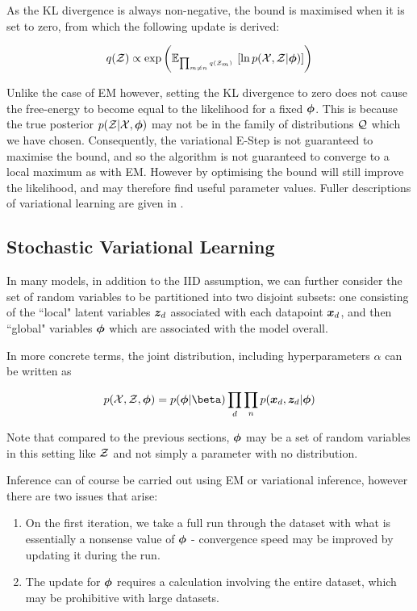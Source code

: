 As the KL divergence is always non-negative, the bound is maximised when it is set to zero, from which the following update is derived: 

\begin{align*}
q({ \mathcal{Z} }) \propto \exp\left( { \mathbb{E}_{ { {{ \mbox{\tiny ${\prod_{m\neq n} q({ \mathcal{Z} }_m)}$ } }} } }\left[ { \ln { p( { \mathcal{X} } ,  { \mathcal{Z} } |  {  \bm \phi  } ) } } \right] }  \right)
\end{align*}

Unlike the case of EM however, setting the KL divergence to zero does not cause the free-energy to become equal to the likelihood for a fixed ${ \bm \phi }$. This is because the true posterior $p({ \mathcal{Z} } | { \mathcal{X} }, { \bm \phi })$ may not be in the family of distributions ${ \mathcal{Q} }$ which we have chosen. Consequently, the variational E-Step is not guaranteed to maximise the bound, and so the algorithm is not guaranteed to converge to a local maximum as with EM. However by optimising the bound will still improve the likelihood, and may therefore find useful parameter values. Fuller descriptions of variational learning are given in \cite{Jordan1999a}\cite{Bishop2006}\cite{Tzikas2008}. 

\subsection{Stochastic Variational Learning}
In many models, in addition to the IID assumption, we can further consider the set of random variables to be partitioned into two disjoint subsets: one consisting of the ``local" latent variables ${ \bm z_d }$  associated with each datapoint ${ \bm x_d }$, and then ``global" variables ${ \bm \phi }$ which are associated with the model overall.

In more concrete terms, the joint distribution, including hyperparameters $\alpha$ can be written as

\begin{align*}
p(\xdat, \zdat, \param) = p(\param | \beta)  \prod_d \prod_n p(\xd, \zd | \param)\end{align*}

Note that compared to the previous sections, ${ \bm \phi }$ may be a set of random variables in this setting like ${ \mathcal{Z} }$ and not simply a parameter with no distribution.

Inference can of course be carried out using EM or variational inference, however there are two issues that arise:

\begin{enumerate}
    \item On the first iteration, we take a full run through the dataset with what is essentially a nonsense value of ${ \bm \phi }$ - convergence speed may be improved by updating it during the run.
    \item The update for ${ \bm \phi }$ requires a calculation involving the entire dataset, which may be prohibitive with large datasets.\
\end{enumerate}

